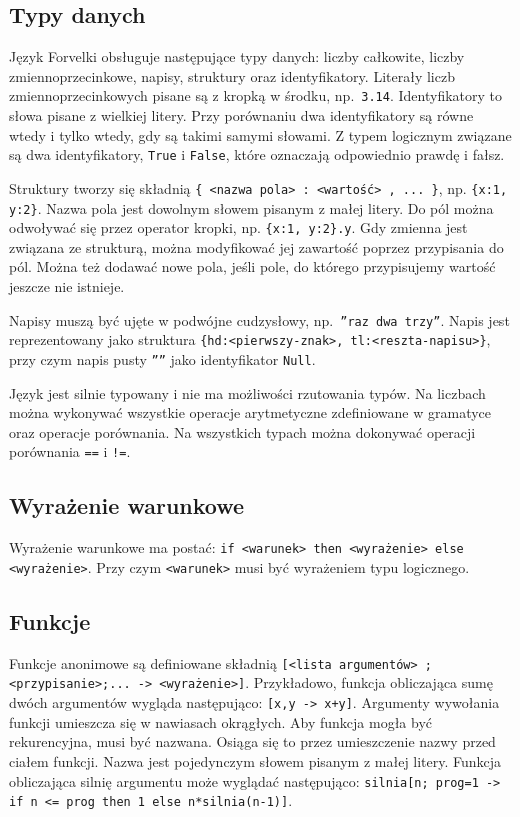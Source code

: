 \documentclass[4paper,10pt]{article}
\begin{document}
\subsection{Typy danych}
Język Forvelki obsługuje następujące typy danych: liczby całkowite, liczby zmiennoprzecinkowe, napisy, struktury oraz identyfikatory.
Literały liczb zmiennoprzecinkowych pisane są z kropką w środku, np.~\texttt{3.14}.
Identyfikatory to słowa pisane z wielkiej litery.
Przy porównaniu dwa identyfikatory są równe wtedy i tylko wtedy, gdy są takimi samymi słowami.
Z typem logicznym związane są dwa identyfikatory, \texttt{True} i \texttt{False}, które oznaczają odpowiednio prawdę i fałsz.

Struktury tworzy się składnią \texttt{\{ <nazwa pola> : <wartość> , ... \}}, np. \texttt{\{x:1, y:2\}}.
Nazwa pola jest dowolnym słowem pisanym z małej litery.
Do pól można odwoływać się przez operator kropki, np. \texttt{\{x:1,~y:2\}.y}.
Gdy zmienna jest związana ze strukturą, można modyfikować jej zawartość poprzez przypisania do pól.
Można też dodawać nowe pola, jeśli pole, do którego przypisujemy wartość jeszcze nie istnieje.

Napisy muszą być ujęte w podwójne cudzysłowy, np.~\texttt{''raz dwa trzy''}.
Napis jest reprezentowany jako struktura \texttt{\{hd:<pierwszy-znak>,~tl:<reszta-napisu>\}}, przy czym napis pusty \texttt{''''} jako identyfikator \texttt{Null}.

Język jest silnie typowany i nie ma możliwości rzutowania typów.
Na liczbach można wykonywać wszystkie operacje arytmetyczne zdefiniowane w gramatyce oraz operacje porównania.
Na wszystkich typach można dokonywać operacji porównania \texttt{==} i \texttt{!=}.

\subsection{Wyrażenie warunkowe}
Wyrażenie warunkowe ma postać:
\texttt{if <warunek> then <wyrażenie> else <wyrażenie>}.
Przy czym \texttt{<warunek>} musi być wyrażeniem typu logicznego.

\subsection{Funkcje}
Funkcje anonimowe są definiowane składnią \texttt{[<lista argumentów> ;<przypisanie>;... ->  <wyrażenie>]}.
Przykładowo, funkcja obliczająca sumę dwóch argumentów wygląda następująco: \texttt{[x,y~->~x+y]}.
Argumenty wywołania funkcji umieszcza się w nawiasach okrągłych.
Aby funkcja mogła być rekurencyjna, musi być nazwana.
Osiąga się to przez umieszczenie nazwy przed ciałem funkcji.
Nazwa jest pojedynczym słowem pisanym z małej litery.
Funkcja obliczająca silnię argumentu może wyglądać następująco: \texttt{silnia[n; prog=1 -> if n <= prog then 1 else n*silnia(n-1)]}.
\end{document}
